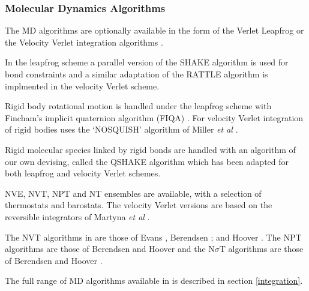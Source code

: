 \subsubsection{Molecular Dynamics Algorithms}

The \D{} MD algorithms are optionally available in the
form of the Verlet Leapfrog or the
Velocity Verlet integration
algorithms \cite{allen-89a}.

In the leapfrog scheme a parallel version of the SHAKE
algorithm \cite{ryckaert-77a,smith-94b} is used
for bond constraints and a similar adaptation
of the RATTLE algorithm \cite{andersen-83a} is
implmented in the velocity Verlet scheme.

Rigid body rotational motion  is handled under the
leapfrog scheme with Fincham's implicit quaternion
algorithm (FIQA) \cite{fincham-92a}.  For
velocity Verlet integration of rigid bodies \D{} uses the `NOSQUISH'
algorithm of Miller {\em et al}  \cite{miller-02a}.

Rigid molecular species linked by rigid bonds are
handled with an algorithm of our own devising, called the QSHAKE
algorithm \cite{forester-96a} which has been
adapted for both leapfrog and velocity Verlet schemes.

NVE, NVT, NPT and N\mat{\sigma}T ensembles are
available, with a selection of thermostats and
barostats. The velocity Verlet versions are based on
the reversible integrators of Martyna {\em et al} \cite{martyna-96a}. 

The NVT algorithms in \D{} are those of Evans \cite{evans-84a}, Berendsen
\cite{berendsen-84a}; and Hoover
\cite{hoover-85a}. The NPT algorithms are those of
Berendsen \cite{berendsen-84a} and
Hoover \cite{hoover-85a} and the N$\sigma$T
algorithms are those of Berendsen
\cite{berendsen-84a} and Hoover
\cite{hoover-85a}.

The full range of MD algorithms available in \D{} is
described in section \ref{integration}.

